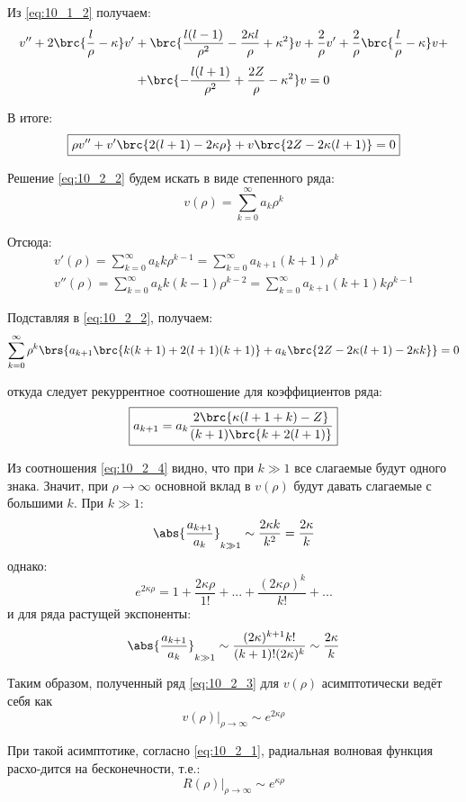 Из \eqref{eq:10_1_2} получаем:
$$
v'' + 2\brc{\frac{l}{\rho} - \kappa}v' + \brc{ \frac{l(l-1)}{\rho^2} - \frac{2\kappa l}{\rho} + \kappa^2 } v + \frac{2}{\rho}v' + \frac{2}{\rho} \brc{ \frac{l}{\rho} - \kappa} v + 
$$
$$
+\brc{- \frac{l(l+1)}{\rho^2} + \frac{2Z}{\rho} - \kappa^2}v = 0
$$

В итоге:
\begin{equation}
\label{eq:10_2_2}
\boxed{
	\rho v'' + v' \brc{2(l+1) - 2\kappa \rho} + v\brc{2Z - 2\kappa(l+1)} = 0
}
\end{equation}

Решение \eqref{eq:10_2_2} будем искать в виде степенного ряда:
\begin{equation}
\label{eq:10_2_3}
v(\rho) = \sum_{k=0}^{\infty} a_k \rho^k
\end{equation}

Отсюда:
$$
\begin{gathered}
v'(\rho) = \sum_{k=0}^{\infty} a_k k \rho^{k-1} = \sum_{k=0}^{\infty} a_{k+1} (k+1) \rho^k \\
v''(\rho) = \sum_{k=0}^{\infty} a_k k (k-1) \rho^{k-2} = \sum_{k=0}^{\infty} a_{k+1} (k+1) k \rho^{k-1}
\end{gathered}
$$

Подставляя в \eqref{eq:10_2_2}, получаем:
$$
\sum_{k=0}^{\infty} \rho^k \brs{a_{k+1} \brc{k(k+1) + 2(l+1)(k+1)} + a_k\brc{2Z - 2\kappa(l+1) - 2\kappa k} } = 0
$$

откуда следует рекуррентное соотношение для коэффициентов ряда:
\begin{equation}
\label{eq:10_2_4}
\boxed{
	a_{k+1} = a_k \frac{2\brc{\kappa(l+1+k)-Z}}{(k+1)\brc{k+2(l+1)}}
}
\end{equation}

Из соотношения \eqref{eq:10_2_4} видно, что при $k \gg 1$ все слагаемые будут одного знака. Значит, при $\rho \to \infty$ основной вклад в $v(\rho)$ будут давать слагаемые с большими $k$. При $k \gg 1$:
$$
{ \abs{\frac{a_{k+1}}{a_k}} }_{k \gg 1} \sim \frac{2\kappa k}{k^2} = \frac{2\kappa}{k}
$$
однако:
$$
e^{2\kappa \rho} = 1 + \frac{2\kappa \rho}{1!} + ... + \frac{(2\kappa \rho)^k}{k!} + ...
$$
и для ряда растущей экспоненты:
$$
{ \abs{\frac{a_{k+1}}{a_k}} }_{k \gg 1} \sim \frac{(2\kappa)^{k+1} k!}{(k+1)! (2\kappa)^k} \sim \frac{2\kappa}{k}
$$

Таким образом, полученный ряд \eqref{eq:10_2_3} для $v(\rho)$ асимптотически ведёт себя как
$$
\left. v(\rho) \right|_{\rho \to \infty} \sim e^{2\kappa \rho}
$$

При такой асимптотике, согласно \eqref{eq:10_2_1}, радиальная волновая функция расхо-дится на бесконечности, т.е.:
$$
\left. R(\rho) \right|_{\rho \to \infty} \sim e^{\kappa \rho}
$$

